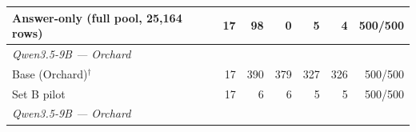 \begin{table}[t]
{\begin{tabular}{lrrrrrr}
Answer-only (full pool, 25,164 rows) & 17 & 98 & 0 & 5 & 4 & 500/500 \\
\midrule
\multicolumn{7}{l}{\textit{Qwen3.5-9B --- Orchard}} \\
Base (Orchard)$^{\dagger}$ & 17 & 390 & 379 & 327 & 326 & 500/500 \\
Set B pilot & 17 & 6 & 6 & 5 & 5 & 500/500 \\
\midrule
\multicolumn{7}{l}{\textit{Qwen3.5-9B --- Orchard}} \\

\end{tabular}}
\end{table}
